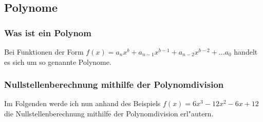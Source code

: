 \subsection{Polynome}
\subsubsection{Was ist ein Polynom}
Bei Funktionen der Form $f(x) = a_n x^b + a_{n-1} x^{b-1} + a_{n-2} x^{b-2} + ... a_0$ handelt es sich um so genannte Polynome.\\

\subsubsection{Nullstellenberechnung mithilfe der Polynomdivision}
Im Folgenden werde ich nun anhand des Beispiels $f(x) = 6x^3 - 12x^2 - 6x + 12$ die Nullstellenberechnung mithilfe der Polynomdivision erl"autern.\\
